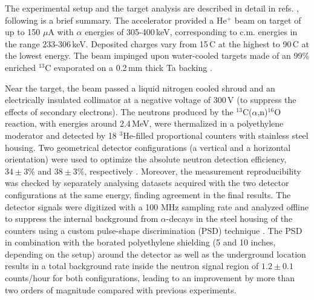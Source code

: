\documentclass[%
reprint,
groupedaddress,
showpacs,
nofootinbib,
amsmath,amssymb,
aps,
prl,
superscriptaddress,
notitlepage,
floatfix
]{revtex4-2}
\begin{document}
The experimental setup and the target analysis are  described in detail in refs. \cite{Ciani:2020,CSEDREKI2021165081,CianiPhd}, following is a brief summary. The accelerator provided a He$^+$ beam on target of up to 150 $\mu$A with $\alpha$ energies of 305-400\,keV, corresponding to c.m. energies in the range 233-306\,keV. Deposited charges vary from 15\,C at the highest to 90\,C at the lowest energy.
The beam impinged upon water-cooled targets made of an 99\% enriched $^{13}$C evaporated on a 0.2\,mm thick Ta backing \cite{Ciani:2020}.

Near the target, the beam passed a liquid nitrogen cooled shroud  and an electrically insulated collimator at a negative voltage of 300\,V (to suppress the effects of secondary electrons).
The neutrons produced by the $^{13}$C($\alpha$,n)$^{16}$O reaction, with energies around 2.4\,MeV, were thermalized in a polyethylene moderator and detected by 18 $^3$He-filled proportional counters with stainless steel housing. 
Two geometrical detector configurations (a vertical and a horizontal orientation) were used to optimize  the absolute neutron detection efficiency, $34 \pm 3$\% and $38 \pm 3$\%, respectively \cite{CSEDREKI2021165081}. Moreover, the measurement reproducibility was checked by separately analysing datasets acquired with the two detector configurations at the same energy, finding agreement in the final results. 
The detector signals were digitized with a 100 MHz sampling rate and analyzed offline to suppress the internal background from $\alpha$-decays in the steel housing of the counters using a custom pulse-shape discrimination (PSD) technique \cite{Balibrea:2018}.
The PSD in combination with the borated polyethylene shielding (5 and 10 inches, depending on the setup) around the detector as well as the underground location results in a total background rate inside the neutron signal region of $1.2 \pm 0.1$\,counts/hour for both configurations, %
leading to an improvement by more than two orders of magnitude compared with previous experiments.
\end{document}
